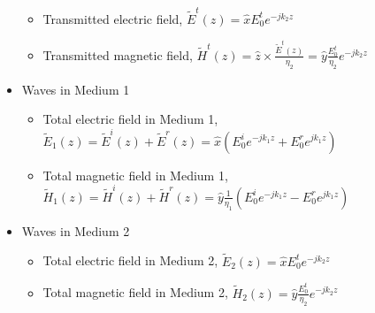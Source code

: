 \documentclass[a4paper]{article}
\begin{document}
\begin{itemize}
\begin{itemize}[label=$\circ$]
        \item Transmitted electric field, $\widetilde{E}^t(z) = \hat{x}E^t_0e^{-jk_2z}$
        \item Transmitted magnetic field, $\widetilde{H}^t(z) = \hat{z}\times\displaystyle\frac{\widetilde{E}^t(z)}{\eta_2} = \hat{y}\displaystyle\frac{E^t_0}{\eta_2}e^{-jk_2z}$
    \end{itemize}
    \item Waves in Medium 1
    \begin{itemize}[label=$\circ$]
        \item Total electric field in Medium 1, $\widetilde{E}_1(z) = \widetilde{E}^i(z) + \widetilde{E}^r(z) = \hat{x}(E^i_0e^{-jk_1z}+E^r_0e^{jk_1z})$
        \item Total magnetic field in Medium 1, $\widetilde{H}_1(z) = \widetilde{H}^i(z) + \widetilde{H}^r(z) = \hat{y}\displaystyle\frac{1}{\eta_1}(E^i_0e^{-jk_1z}-E^r_0e^{jk_1z})$
    \end{itemize}
    \item Waves in Medium 2
    \begin{itemize}[label=$\circ$]
        \item Total electric field in Medium 2, $\widetilde{E}_2(z) = \hat{x}E^t_0e^{-jk_2z}$
        \item Total magnetic field in Medium 2, $\widetilde{H}_2(z) = \hat{y}\displaystyle\frac{E^t_0}{\eta_2}e^{-jk_2z}$
    \end{itemize}
\end{itemize}

\newpage
\end{document}
